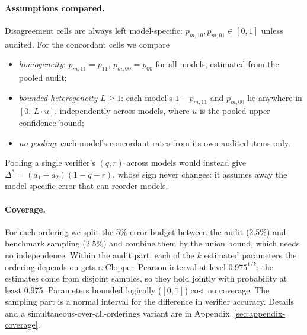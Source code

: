 \paragraph{Assumptions compared.} Disagreement cells are always left
model-specific: $p_{m,10},p_{m,01}\in[0,1]$ unless audited. For the
concordant cells we compare
\begin{itemize}\itemsep1pt
  \item \emph{homogeneity}: $p_{m,11}=p_{11}$, $p_{m,00}=p_{00}$ for all
  models, estimated from the pooled audit;
  \item \emph{bounded heterogeneity} $L\ge1$: each model's
  $1-p_{m,11}$ and $p_{m,00}$ lie anywhere in $[0,\,L\cdot u]$, independently
  across models, where $u$ is the pooled upper confidence bound;
  \item \emph{no pooling}: each model's concordant rates from its own audited
  items only.
\end{itemize}
Pooling a single verifier's $(q,r)$ across models would instead give
$\Delta^\ast=(a_1-a_2)(1-q-r)$, whose sign never changes: it assumes away the
model-specific error that can reorder models.

\paragraph{Coverage.} For each ordering we split the 5\% error budget
between the audit (2.5\%) and benchmark sampling (2.5\%) and combine them by
the union bound, which needs no independence. Within the audit part, each
of the $k$ estimated parameters the ordering depends on gets a
Clopper--Pearson interval at level $0.975^{1/k}$; the estimates come from
disjoint samples, so they hold jointly with probability at least 0.975.
Parameters bounded logically ($[0,1]$) cost no coverage. The sampling part is
a normal interval for the difference in verifier accuracy. Details and a
simultaneous-over-all-orderings variant are in
Appendix~\ref{sec:appendix-coverage}.
